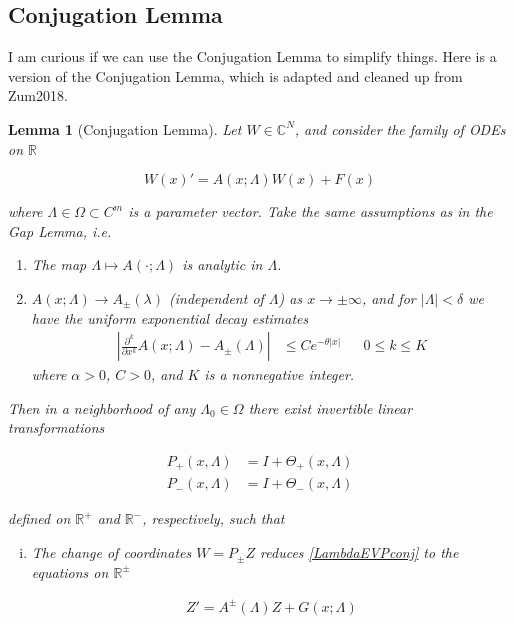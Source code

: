 \documentclass[12pt]{article}
\def\R{{\mathbb R}}
\def\C{{\mathbb C}}
\newtheorem{lemma}{Lemma}
\begin{document}
\subsection*{Conjugation Lemma}

I am curious if we can use the Conjugation Lemma to simplify things. Here is a version of the Conjugation Lemma, which is adapted and cleaned up from Zum2018.

\begin{lemma}[Conjugation Lemma]
Let $W \in \C^N$, and consider the family of ODEs on $\R$

\begin{equation}\label{LambdaEVPconj}
W(x)' = A(x; \Lambda) W(x) + F(x) 
\end{equation}

where $\Lambda \in \Omega \subset C^m$ is a parameter vector. Take the same assumptions as in the Gap Lemma, i.e. 

\begin{enumerate}
	\item The map $\Lambda \mapsto A(\cdot; \Lambda)$ is analytic in $\Lambda$.
	\item $A(x; \Lambda) \rightarrow A_\pm(\lambda)$ (independent of $\Lambda$) as $x \rightarrow \pm \infty$, and for $|\Lambda| < \delta$ we have the uniform exponential decay estimates 
	\begin{align}
	\left| \frac{\partial^k}{\partial x^k} A(x; \Lambda) - A_\pm(\Lambda) \right| 
	&\leq C e^{-\theta |x|} && 0 \leq k \leq K
	\end{align}
	where $\alpha > 0$, $C > 0$, and $K$ is a nonnegative integer.
\end{enumerate}

Then in a neighborhood of any $\Lambda_0 \in \Omega$ there exist invertible linear transformations

\begin{align*}
P_+(x, \Lambda) &= I + \Theta_+(x, \Lambda) \\
P_-(x, \Lambda) &= I + \Theta_-(x, \Lambda) 
\end{align*}

defined on $\R^+$ and $\R^-$, respectively, such that

\begin{enumerate}[(i)]
\item The change of coordinates $W = P_\pm Z$ reduces \eqref{LambdaEVPconj} to the equations on $\R^\pm$

\begin{align}
Z' = A^\pm(\Lambda) Z + G(x; \Lambda)
\end{align}


\end{enumerate}
\end{lemma}
\end{document}
